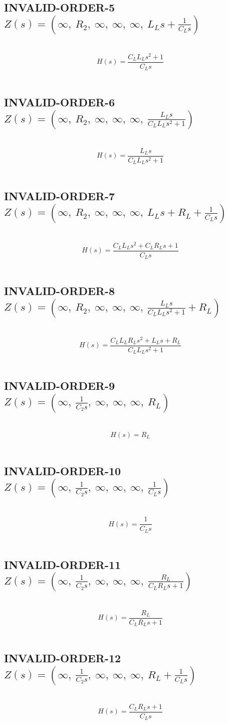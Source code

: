 \documentclass{article}
\begin{document}
\subsection{INVALID-ORDER-5 $Z(s) = \left( \infty, \  R_{2}, \  \infty, \  \infty, \  \infty, \  L_{L} s + \frac{1}{C_{L} s}\right)$ } \ 
\textbf{\[H(s) = \frac{C_{L} L_{L} s^{2} + 1}{C_{L} s}\] } \ 
\subsection{INVALID-ORDER-6 $Z(s) = \left( \infty, \  R_{2}, \  \infty, \  \infty, \  \infty, \  \frac{L_{L} s}{C_{L} L_{L} s^{2} + 1}\right)$ } \ 
\textbf{\[H(s) = \frac{L_{L} s}{C_{L} L_{L} s^{2} + 1}\] } \ 
\subsection{INVALID-ORDER-7 $Z(s) = \left( \infty, \  R_{2}, \  \infty, \  \infty, \  \infty, \  L_{L} s + R_{L} + \frac{1}{C_{L} s}\right)$ } \ 
\textbf{\[H(s) = \frac{C_{L} L_{L} s^{2} + C_{L} R_{L} s + 1}{C_{L} s}\] } \ 
\subsection{INVALID-ORDER-8 $Z(s) = \left( \infty, \  R_{2}, \  \infty, \  \infty, \  \infty, \  \frac{L_{L} s}{C_{L} L_{L} s^{2} + 1} + R_{L}\right)$ } \ 
\textbf{\[H(s) = \frac{C_{L} L_{L} R_{L} s^{2} + L_{L} s + R_{L}}{C_{L} L_{L} s^{2} + 1}\] } \ 
\subsection{INVALID-ORDER-9 $Z(s) = \left( \infty, \  \frac{1}{C_{2} s}, \  \infty, \  \infty, \  \infty, \  R_{L}\right)$ } \ 
\textbf{\[H(s) = R_{L}\] } \ 
\subsection{INVALID-ORDER-10 $Z(s) = \left( \infty, \  \frac{1}{C_{2} s}, \  \infty, \  \infty, \  \infty, \  \frac{1}{C_{L} s}\right)$ } \ 
\textbf{\[H(s) = \frac{1}{C_{L} s}\] } \ 
\subsection{INVALID-ORDER-11 $Z(s) = \left( \infty, \  \frac{1}{C_{2} s}, \  \infty, \  \infty, \  \infty, \  \frac{R_{L}}{C_{L} R_{L} s + 1}\right)$ } \ 
\textbf{\[H(s) = \frac{R_{L}}{C_{L} R_{L} s + 1}\] } \ 
\subsection{INVALID-ORDER-12 $Z(s) = \left( \infty, \  \frac{1}{C_{2} s}, \  \infty, \  \infty, \  \infty, \  R_{L} + \frac{1}{C_{L} s}\right)$ } \ 
\textbf{\[H(s) = \frac{C_{L} R_{L} s + 1}{C_{L} s}\] } \ 
\end{document}
